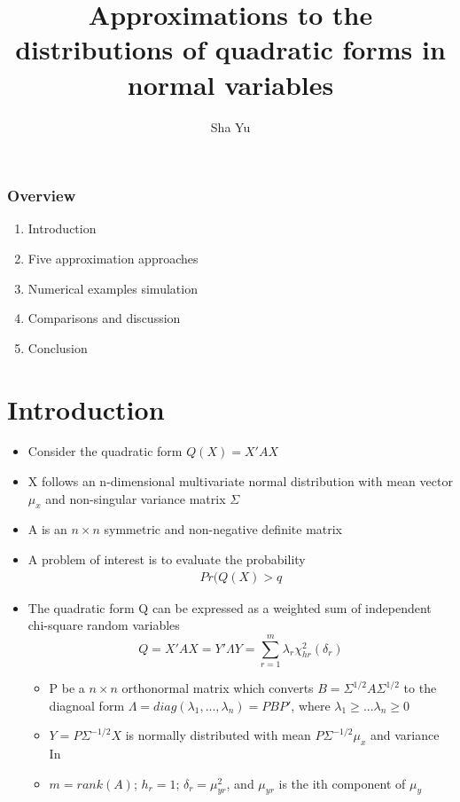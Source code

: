 \documentclass[10pt]{beamer}
\title{Approximations to the distributions of quadratic forms in normal variables}
\author{Sha Yu}
\institute[UNCC]
{
	University of North Carolina at Charlotte
}
\begin{document}
	
	\frame{\titlepage}

\begin{frame}
\frametitle{Overview}
	\begin{enumerate}
		\item Introduction
		\item Five approximation approaches
		\item Numerical examples simulation
		\item Comparisons and discussion
		\item Conclusion
	\end{enumerate}
\end{frame}	

\section*{Introduction}
	
\begin{frame}
	\begin{itemize}
	\item Consider the quadratic form $Q(X)=X'AX$
	\item X follows an n-dimensional multivariate normal distribution with mean vector $\mu_x$ and non-singular variance matrix $\Sigma$	
	\item A is an $n \times n$ symmetric and non-negative definite matrix
	\item A problem of interest is to evaluate the probability 
	\begin{align}
	Pr(Q(X)>q
	\end{align}
	\end{itemize}
\end{frame}
	
\begin{frame}
	\begin{itemize}
		\item The quadratic form Q can be expressed as a weighted sum of independent chi-square random variables
		\[Q=X'AX=Y'{\Lambda}Y=\sum_{r=1}^m\lambda_r\chi_{hr}^2(\delta_r)\]
		\begin{itemize}
			\item P be a $n \times n$ orthonormal matrix which converts $B={\Sigma}^{1/2}A{\Sigma}^{1/2}$ to the diagnoal form $\Lambda=diag(\lambda_1,...,\lambda_n)=PBP'$, where $\lambda_1\ge...\lambda_n\ge0$
			\item$Y=P\Sigma^{-1/2}X$ is normally distributed with mean $P\Sigma^{-1/2}\mu_x$ and variance In	
			\item $m=rank(A)$; $h_r=1$; $\delta_r=\mu_{yr}^2$, and $\mu_{yr}$ is the ith component of $\mu_y$
		\end{itemize}
	\end{itemize}
\end{frame}
\end{document}
